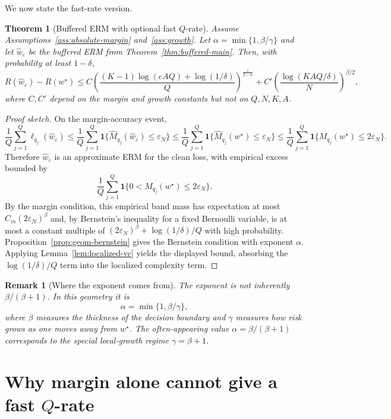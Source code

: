 \documentclass[11pt]{article}
\newtheorem{theorem}{Theorem}
\newtheorem{remark}{Remark}
\newcommand{\one}{\mathbf 1}
\newcommand{\what}{\widehat w}
\newcommand{\wstar}{w^\star}
\newcommand{\eps}{\varepsilon}
\begin{document}
We now state the fast-rate version.

\begin{theorem}[Buffered ERM with optional fast $Q$-rate]
\label{thm:fast}
Assume Assumptions~\ref{ass:absolute-margin} and~\ref{ass:growth}.  Let $\alpha=\min\{1,\beta/\gamma\}$ and let $\what_\eps$ be the buffered ERM from Theorem~\ref{thm:buffered-main}.  Then, with probability at least $1-\delta$,
\[
R(\what_\eps)-R(\wstar)
\le
C
\left(
\frac{(K-1)\log(eAQ)+\log(1/\delta)}{Q}
\right)^{\frac{1}{2-\alpha}}
+
C'
\left(\frac{\log(KAQ/\delta)}{N}\right)^{\beta/2},
\]
where $C,C'$ depend on the margin and growth constants but not on $Q,N,K,A$.
\end{theorem}

\begin{proof}[Proof sketch]
On the margin-accuracy event,
\[
\frac1Q\sum_{j=1}^Q\ell_{q_j}(\what_\eps)
\le
\frac1Q\sum_{j=1}^Q\one\{\widehat M_{q_j}(\what_\eps)\le\eps_N\}
\le
\frac1Q\sum_{j=1}^Q\one\{\widehat M_{q_j}(\wstar)\le\eps_N\}
\le
\frac1Q\sum_{j=1}^Q\one\{M_{q_j}(\wstar)\le2\eps_N\}.
\]
Therefore $\what_\eps$ is an approximate ERM for the clean loss, with empirical excess bounded by
\[
\frac1Q\sum_{j=1}^Q\one\{0<M_{q_j}(\wstar)\le2\eps_N\}.
\]
By the margin condition, this empirical band mass has expectation at most $C_m(2\eps_N)^\beta$ and, by Bernstein's inequality for a fixed Bernoulli variable, is at most a constant multiple of $(2\eps_N)^\beta+\log(1/\delta)/Q$ with high probability.  Proposition~\ref{prop:geom-bernstein} gives the Bernstein condition with exponent $\alpha$.  Applying Lemma~\ref{lem:localized-vc} yields the displayed bound, absorbing the $\log(1/\delta)/Q$ term into the localized complexity term.
\end{proof}

\begin{remark}[Where the exponent comes from]
The exponent is not inherently $\beta/(\beta+1)$.  In this geometry it is
\[
\alpha=\min\{1,\beta/\gamma\},
\]
where $\beta$ measures the thickness of the decision boundary and $\gamma$ measures how risk grows as one moves away from $\wstar$.  The often-appearing value $\alpha=\beta/(\beta+1)$ corresponds to the special local-growth regime $\gamma=\beta+1$.
\end{remark}

\section{Why margin alone cannot give a fast $Q$-rate}
\end{document}
